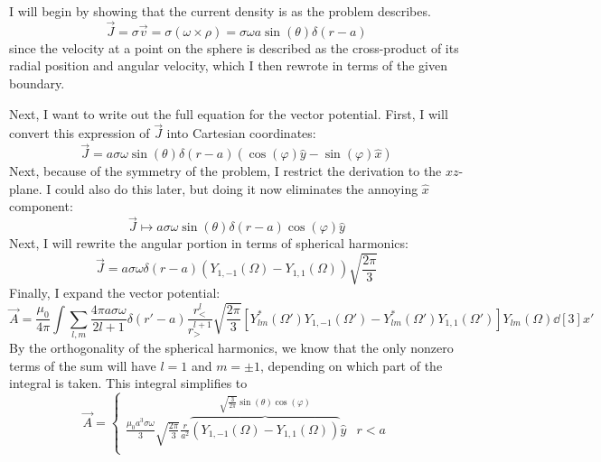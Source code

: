 \documentclass[a4paper,twoside]{article}
\begin{document}
\begin{problem}
    I will begin by showing that the current density is as the problem describes.
    \begin{equation}
        \vec{J} = \sigma \vec{v} = \sigma (\omega \times \rho) = \sigma \omega a \sin(\theta) \delta(r-a)
    \end{equation}
    since the velocity at a point on the sphere is described as the cross-product of its radial position and angular velocity, which I then rewrote in terms of the given boundary.

    Next, I want to write out the full equation for the vector potential. First, I will convert this expression of $ \vec{J} $ into Cartesian coordinates:
    \begin{equation}
        \vec{J} = a \sigma \omega \sin(\theta) \delta(r-a) (\cos(\varphi) \hat{y} - \sin(\varphi) \hat{x})
    \end{equation}
    Next, because of the symmetry of the problem, I restrict the derivation to the $ xz $-plane. I could also do this later, but doing it now eliminates the annoying $ \hat{x} $ component:
    \begin{equation}
        \vec{J} \mapsto a \sigma \omega \sin(\theta) \delta(r-a) \cos(\varphi) \hat{y}
    \end{equation}
    Next, I will rewrite the angular portion in terms of spherical harmonics:
    \begin{equation}
        \vec{J} = a \sigma \omega \delta(r-a) \left( Y_{1,-1}(\Omega) - Y_{1,1}(\Omega) \right) \sqrt{\frac{2 \pi}{3}}
    \end{equation}
    Finally, I expand the vector potential:
    \begin{equation}
        \vec{A} = \frac{\mu_0}{4 \pi} \int \sum_{l,m} \frac{4 \pi a \sigma \omega}{2l+1} \delta(r'-a) \frac{r_<^l}{r_>^{l+1}} \sqrt{\frac{2 \pi}{3}} \left[ Y_{lm}^* (\Omega')Y_{1,-1}(\Omega') - Y_{lm}^*(\Omega') Y_{1,1}(\Omega') \right]Y_{lm}(\Omega) \dd[3]{x'}
    \end{equation}
    By the orthogonality of the spherical harmonics, we know that the only nonzero terms of the sum will have $ l = 1 $ and $ m = \pm 1 $, depending on which part of the integral is taken. This integral simplifies to
    \begin{equation}
        \vec{A} =
        \begin{cases}
            \frac{\mu_0 a^3 \sigma \omega}{3} \sqrt{\frac{2 \pi}{3}} \frac{r}{a^2} \overbrace{\left( Y_{1,-1}(\Omega) - Y_{1,1}(\Omega) \right)}^{\sqrt{\frac{3}{2 \pi}} \sin(\theta) \cos(\varphi)} \hat{y} & r<a\\

\end{cases}
\end{equation}
\end{problem}
\end{document}
